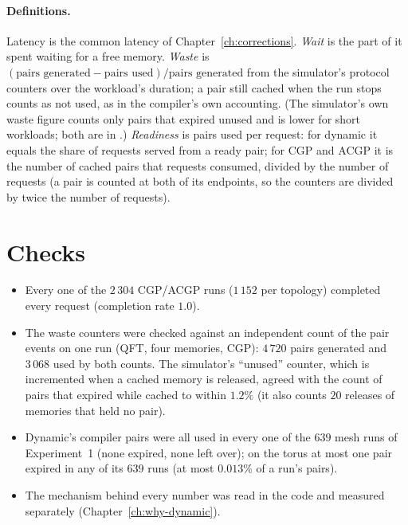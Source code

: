 \paragraph{Definitions.} Latency is the common latency of Chapter~\ref{ch:corrections}. \emph{Wait} is the part of it spent waiting for a free memory. \emph{Waste} is $(\text{pairs generated}-\text{pairs used})/\text{pairs generated}$ from the
simulator's protocol counters over the workload's duration; a pair still cached when the run stops counts as not used, as in the compiler's own accounting. (The simulator's own waste figure counts only pairs that expired unused and
is lower for short workloads; both are in .) \emph{Readiness} is pairs used per request: for dynamic it equals the share of requests served from a ready pair; for CGP and ACGP it is the number of
cached pairs that requests consumed, divided by the number of requests (a pair is counted at both of its endpoints, so the counters are divided by twice the number of requests).

\section{Checks}
\begin{itemize}
  \item Every one of the $2\,304$ CGP/ACGP runs ($1\,152$ per topology) completed every request (completion rate $1.0$).
  \item The waste counters were checked against an independent count of the pair events on one run (QFT, four memories, CGP): $4\,720$ pairs generated and $3\,068$ used by both counts. The simulator's ``unused'' counter, which is
    incremented when a cached memory is released, agreed with the count of pairs that expired while cached to within $1.2\%$ (it also counts $20$ releases of memories that held no pair).
  \item Dynamic's compiler pairs were all used in every one of the $639$ mesh runs of Experiment~1 (none expired, none left over); on the torus at most one pair expired in any of its $639$ runs (at most $0.013\%$ of a run's pairs).
  \item The mechanism behind every number was read in the code and measured separately (Chapter~\ref{ch:why-dynamic}).
\end{itemize}

